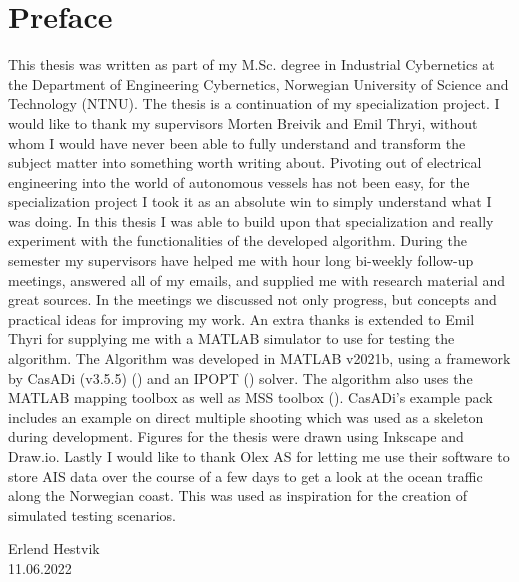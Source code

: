 \newpage

\section*{Preface}

This thesis was written as part of my M.Sc. degree in Industrial Cybernetics
at the Department of Engineering Cybernetics, Norwegian University of Science
and Technology (NTNU). The thesis is a continuation of my specialization project.
I would like to thank my supervisors Morten Breivik and Emil Thryi, without whom I would have
never been able to fully understand and transform the subject matter into something worth writing about.\newline
Pivoting out of electrical engineering into the world of autonomous vessels has not been easy, for
the specialization project I took it as an absolute win to simply understand what I was doing. In this 
thesis I was able to build upon that specialization and really experiment with the functionalities of the developed
algorithm.\newline
During the semester my supervisors have helped me with hour long bi-weekly follow-up meetings, answered
all of my emails, and supplied me with research material and great sources. In the meetings we discussed
not only progress, but concepts and practical ideas for improving my work.\newline
An extra thanks is extended to Emil Thyri for supplying me with a MATLAB simulator to use for testing the algorithm.
The Algorithm was developed in MATLAB v2021b, using a framework by CasADi (v3.5.5) (\cite{andersson2019casadi}) and an IPOPT (\cite{wachter2006implementation}) solver. The algorithm
also uses the MATLAB mapping toolbox as well as MSS toolbox (\cite{MSStoolbox}). CasADi's example pack includes an example on 
direct multiple shooting which was used as a skeleton during development. Figures for the thesis were drawn
using Inkscape and Draw.io. Lastly I would like to thank Olex AS for letting me use their software to store AIS data
over the course of a few days to get a look at the ocean traffic along the Norwegian coast. This was used as inspiration
for the creation of simulated testing scenarios.


\begin{center}
    Erlend Hestvik\\
    11.06.2022
\end{center}

\afterpage{\blankpage}